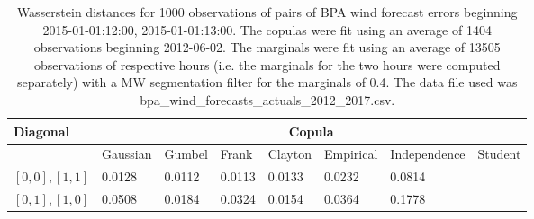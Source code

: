 \begin{table}[h] 
    \centering 
    \begin{tabular}{|l|l|l|l|l|l|l|l|} \hline 
        \textbf{Diagonal} & \multicolumn{7}{c|}{\textbf{Copula}} \\ \hline 
        & Gaussian & Gumbel & Frank & Clayton & Empirical & Independence & Student \\ \hline 
        $[0,0], [1,1]$ & 0.0128 & 0.0112 & 0.0113 & 0.0133 & 0.0232 & 0.0814 &  \\ \hline 
        $[0,1], [1,0]$ & 0.0508 & 0.0184 & 0.0324 & 0.0154 & 0.0364 & 0.1778 &  \\ \hline 
    \end{tabular} 
    \caption{Wasserstein distances for 1000 observations of pairs of BPA wind forecast errors beginning 2015-01-01:12:00, 2015-01-01:13:00. The copulas were fit  using an average of 1404 observations beginning 2012-06-02. The marginals were fit using an average of 13505 observations of respective hours (i.e. the  marginals for the two hours were computed separately) with a MW segmentation filter for the marginals of 0.4. The data file used was bpa\_wind\_forecasts\_actuals\_2012\_2017.csv.} 
\end{table}